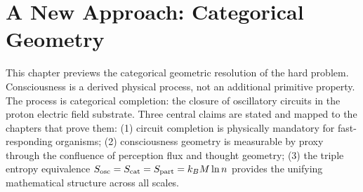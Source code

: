 \chapter{A New Approach: Categorical Geometry}
\label{ch:new_approach}


\begin{chapterabstract}
This chapter previews the categorical geometric resolution of the hard problem. Consciousness is a derived physical process, not an additional primitive property. The process is categorical completion: the closure of oscillatory circuits in the proton electric field substrate. Three central claims are stated and mapped to the chapters that prove them: (1) circuit completion is physically mandatory for fast-responding organisms; (2) consciousness geometry is measurable by proxy through the confluence of perception flux and thought geometry; (3) the triple entropy equivalence $S_{\mathrm{osc}} = S_{\mathrm{cat}} = S_{\mathrm{part}} = k_B M \ln n$ provides the unifying mathematical structure across all scales.
\end{chapterabstract}



